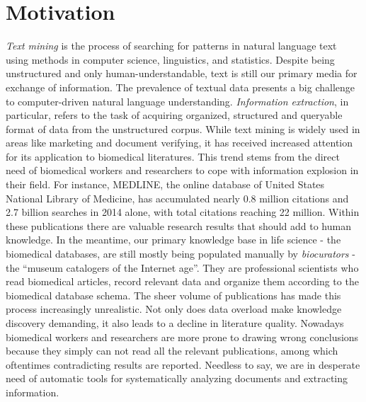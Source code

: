 \section{Motivation}\label{section1.1} %
\emph{Text mining} is the process of searching for patterns in natural language text using methods in computer science, linguistics, and statistics. Despite being unstructured and only human-understandable, text is still our primary media for exchange of information\cite{witten2005text}. The prevalence of textual data presents a big challenge to computer-driven natural language understanding. \emph{Information extraction}, in particular, refers to the task of acquiring organized, structured and queryable format of data from the unstructured corpus. \newline\newline
While text mining is widely used in areas like marketing and document verifying, it has received increased attention for its application to biomedical literatures\cite{kim2003genia,ananiadou2006text,krallinger2005text}. This trend stems from the direct need of biomedical workers and researchers to cope with information explosion in their field. For instance, MEDLINE, the online database of United States National Library of Medicine, has accumulated nearly 0.8 million citations and 2.7 billion searches in 2014 alone\cite{MEDLINE:2015:Online}, with total citations reaching 22 million. Within these publications there are valuable research results that should add to human knowledge. In the meantime,  our primary knowledge base in life science - the biomedical databases, are still mostly being populated manually by \emph{biocurators} - the ``museum catalogers of the Internet age''\cite{wiki:biocurators}. They are professional scientists who read biomedical articles, record relevant data and organize them according to the biomedical database schema. The sheer volume of publications has made this process increasingly unrealistic\cite{cohen2005survey}.\newline\newline
Not only does data overload make knowledge discovery demanding, it also leads to a decline in literature quality. Nowadays biomedical workers and researchers are more prone to drawing wrong conclusions because they simply can not read all the relevant publications, among which oftentimes contradicting results are reported. Needless to say, we are in desperate need of automatic tools for systematically analyzing documents and extracting information.


